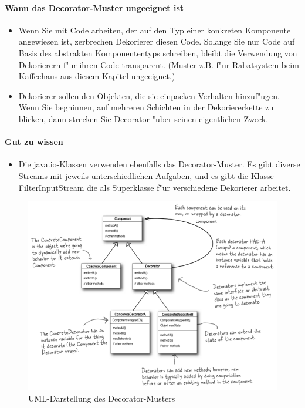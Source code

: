 \paragraph{Wann das Decorator-Muster ungeeignet ist}
\begin{itemize}
\item Wenn Sie mit Code arbeiten, der auf den Typ einer konkreten Komponente angewiesen ist, 
  zerbrechen Dekorierer diesen Code. Solange Sie nur Code auf Basis des abstrakten 
  Komponententyps schreiben, bleibt die Verwendung von Dekorierern f"ur ihren Code transparent.
  (Muster z.B. f"ur Rabatsystem beim Kaffeehaus aus diesem Kapitel ungeeignet.)
\item Dekorierer sollen den Objekten, die sie einpacken Verhalten hinzuf"ugen. Wenn Sie begninnen, 
  auf mehreren Schichten in der Dekoriererkette zu blicken, dann strecken Sie Decorator "uber 
  seinen eigentlichen Zweck.
\end{itemize}
  
\paragraph{Gut zu wissen}
\begin{itemize}
\item Die java.io-Klassen verwenden ebenfalls das Decorator-Muster. Es gibt diverse Streams mit 
  jeweils unterschiedlichen Aufgaben, und es gibt die Klasse FilterInputStream die als Superklasse 
  f"ur verschiedene Dekorierer arbeitet.
\end{itemize}

\begin{figure}
	\centering
	\includegraphics{decorator/img/decoratorUML}
	\caption{UML-Darstellung des Decorator-Musters}
	\label{fig:decoratorUML}
\end{figure}
